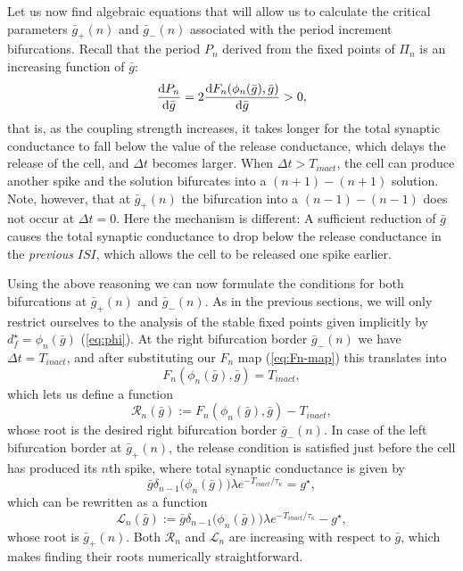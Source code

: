 Let us now find algebraic equations that will allow us to calculate the critical parameters \(\bar g_+(n)\) and \(\bar g_-(n)\) associated with the period increment bifurcations.
Recall that the period \(P_n\) derived from the fixed points of \(\Pi_n\) is an increasing function of \(\bar g\):
\begin{equation}
	\dv{P_{n}}{\bar g}=2\dv{F_n(\phi_n(\bar g), \bar g)}{\bar g}>0,
\end{equation}
that is, as the coupling strength increases, it takes longer for the total synaptic conductance to fall below the value of the release conductance, which delays the release of the \quiet{} cell, and \(\Delta t\) becomes larger.
When \(\Delta t > T_{inact}\), the \free{} cell can produce another spike and the solution bifurcates into a \((n+1)-(n+1)\) solution.
Note, however, that at \(\bar g_+(n)\) the bifurcation into a \((n-1)-(n-1)\) does not occur at \(\Delta t = 0\).
Here the mechanism is different: A sufficient reduction of \(\bar g\) causes the total synaptic conductance to drop below the release conductance in the \emph{previous} \(ISI\), which allows the \quiet{} cell to be released one spike earlier.

Using the above reasoning we can now formulate the conditions for both bifurcations at \(\bar g_+(n)\) and \(\bar g_-(n)\).
As in the previous sections, we will only restrict ourselves to the analysis of the stable fixed points given implicitly by \(d^\star_f=\phi_n(\bar g)\) (\cref{eq:phi}).
At the right bifurcation border \(\bar g_-(n)\) we have \(\Delta t=T_{inact}\), and after substituting our \(F_n\) map (\cref{eq:Fn-map}) this translates into
\begin{equation}
	F_n(\phi_n(\bar g), \bar g) = T_{inact},
\end{equation}
which lets us define a function
\begin{equation}
	\label{eq:R}
	\mathcal{R}_{n}(\bar g):=F_n(\phi_n(\bar g), \bar g)-T_{inact},
\end{equation}
whose root is the desired right bifurcation border \(\bar g_-(n)\).
In case of the left bifurcation border at \(\bar g_+(n)\), the release condition is satisfied just before the \free{} cell has produced its \(n\)th spike, where total synaptic conductance is given by
\begin{equation}
	\bar g \delta_{n-1}\big(\phi_n(\bar g)\big)\lambda e^{-T_{inact}/\tau_\kappa} = g^\star,
\end{equation}
which can be rewritten as a function
\begin{equation}
	\label{eq:L}
	\mathcal{L}_n(\bar g):=\bar g \delta_{n-1}\big(\phi_n(\bar g)\big)\lambda e^{-T_{inact}/\tau_\kappa} -g^\star,
\end{equation}
whose root is \(\bar g_+(n)\).
Both \(\mathcal{R}_n\) and \(\mathcal{L}_n\) are increasing with respect to \(\bar g\), which makes finding their roots numerically straightforward.

